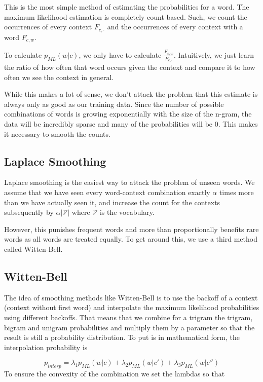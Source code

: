 \documentclass[11pt]{article}
\begin{document}
This is the most simple method of estimating the probabilities for a word. The maximum likelihood estimation is completely count based. Such, we count the occurrences of every context $F_{c,\cdot}$ and the occurrences of every context with a word $F_{c,w}$. 

To calculate $p_{ML}(w|c)$, we only have to calculate $\frac{F_{c,w}}{F_{c,\cdot}}$. Intuitively, we just learn the ratio of how often that word occurs given the context and compare it to how often we see the context in general. 

While this makes a lot of sense, we don't attack the problem that this estimate is always only as good as our training data. Since the number of possible combinations of words is growing exponentially with the size of the n-gram, the data will be incredibly sparse and many of the probabilities will be 0. 
This makes it necessary to smooth the counts.

\subsection{Laplace Smoothing}

Laplace smoothing is the easiest way to attack the problem of unseen words. We assume that we have seen every word-context combination exactly $\alpha$ times more than we have actually seen it, and increase the count for the contexts subsequently by $\alpha |\mathcal{V}|$ where $\mathcal{V}$ is the vocabulary.

However, this punishes frequent words and more than proportionally benefits rare words as all words are treated equally. To get around this, we use a third method called Witten-Bell.

\subsection{Witten-Bell}

The idea of smoothing methods like Witten-Bell is to use the backoff of a context (context without first word) and interpolate the maximum likelihood probabilities using different backoffs. 
That means that we combine for a trigram the trigram, bigram and unigram probabilities and multiply them by a parameter so that the result is still a probability distribution. 
To put is in mathematical form, the interpolation probability is 

$$p_{interp} = \lambda_1p_{ML}(w|c) + \lambda_2p_{ML}(w|c') + \lambda_3p_{ML}(w|c'')$$
To ensure the convexity of the combination we set the lambdas so that
\end{document}

